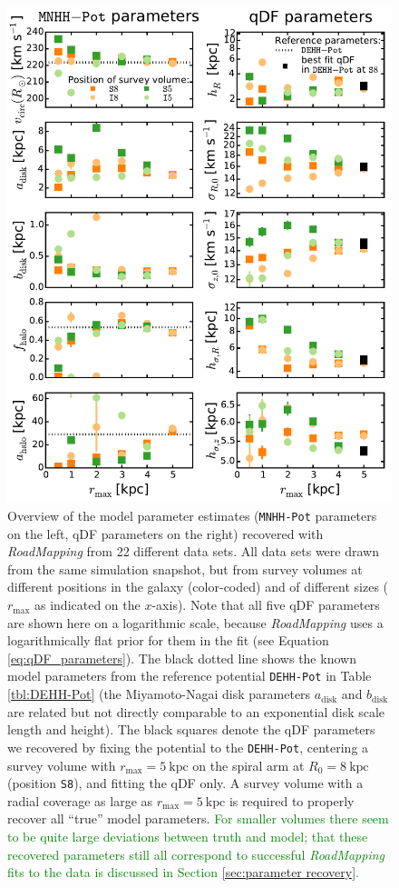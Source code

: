 \documentclass[iop,revtex4,numberedappendix,appendixfloats]{emulateapj}
\newcommand{\RM}{{\sl RoadMapping}}
\newcommand{\NEW}[1]{\textcolor{Green}{#1}}
\begin{document}
\begin{figure}[!htbp]
\centering
\includegraphics[width=\columnwidth]{fig/MNdHHdiffSph2_violins_3.pdf}
\caption{Overview of the model parameter estimates (\texttt{MNHH-Pot} parameters on the left, qDF parameters on the right) recovered with \RM{} from 22 different data sets. All data sets were drawn from the same simulation snapshot, but from survey volumes at different positions in the galaxy (color-coded) and of different sizes ($r_\text{max}$ as indicated on the $x$-axis). Note that all five qDF parameters are shown here on a logarithmic scale, because \RM{} uses a logarithmically flat prior for them in the fit (see Equation \eqref{eq:qDF_parameters}). The black dotted line shows the known model parameters from the reference potential \texttt{DEHH-Pot} in Table \ref{tbl:DEHH-Pot} (the Miyamoto-Nagai disk parameters $a_\text{disk}$ and $b_\text{disk}$ are related but not directly comparable to an exponential disk scale length and height). The black squares denote the qDF parameters we recovered by fixing the potential to the \texttt{DEHH-Pot}, centering a survey volume with $r_\text{max}=5~\text{kpc}$ on the spiral arm at $R_0=8~\text{kpc}$ (position \texttt{S8}), and fitting the qDF only. A survey volume with a radial coverage as large as $r_\text{max}=5~\text{kpc}$ is required to properly recover all ``true'' model parameters. \NEW{For smaller volumes there seem to be quite large deviations between truth and model; that these recovered parameters still all correspond to successful \RM{} fits to the data is discussed in Section \ref{sec:parameter recovery}.}}
\label{fig:model_parameters}
\end{figure}
\end{document}
